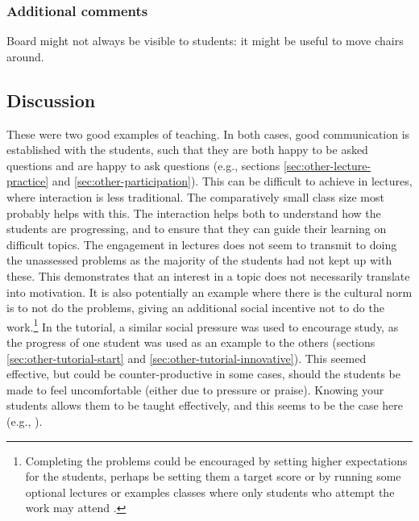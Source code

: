 \subsubsection{Additional comments}

Board might not always be visible to students: it might be useful to move chairs around.

\subsection{Discussion}\label{sec:other-discuss}

These were two good examples of teaching. In both cases, good communication is established with the students, such that they are both happy to be asked questions and are happy to ask questions (e.g., sections \ref{sec:other-lecture-practice} and \ref{sec:other-participation}). This can be difficult to achieve in lectures, where interaction is less traditional. The comparatively small class size most probably helps with this. The interaction helps both to understand how the students are progressing, and to ensure that they can guide their learning on difficult topics. The engagement in lectures does not seem to transmit to doing the unassessed problems as the majority of the students had not kept up with these. This demonstrates that an interest in a topic does not necessarily translate into motivation. It is also potentially an example where there is the cultural norm is to not do the problems, giving an additional social incentive not to do the work.\footnote{Completing the problems could be encouraged by setting higher expectations for the students, perhaps be setting them a target score or by running some optional lectures or examples classes where only students who attempt the work may attend \citep[cf.][chapter 10, passports for seminars case study]{Jaques2007}.} In the tutorial, a similar social pressure was used to encourage study, as the progress of one student was used as an example to the others (sections \ref{sec:other-tutorial-start} and \ref{sec:other-tutorial-innovative}). This seemed effective, but could be counter-productive in some cases, should the students be made to feel uncomfortable (either due to pressure or praise). Knowing your students allows them to be taught effectively, and this seems to be the case here (e.g., ).

